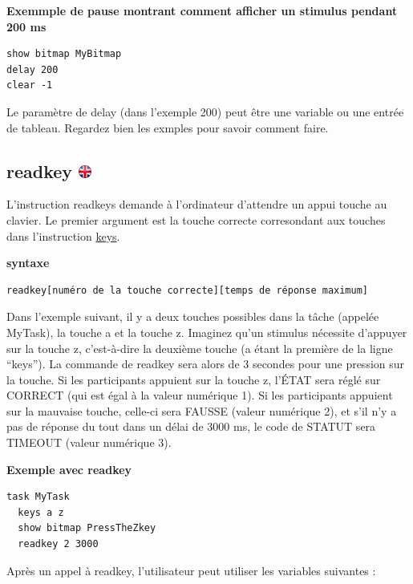 \documentclass[
]{book}
\begin{document}
\textbf{Exemmple de pause montrant comment afficher un stimulus pendant
200 ms}

\begin{verbatim}
show bitmap MyBitmap
delay 200
clear -1
\end{verbatim}

Le paramètre de delay (dans l'exemple 200) peut être une variable ou une
entrée de tableau. Regardez bien les exmples pour savoir comment faire.

\hypertarget{readkey}{%
\subsection[readkey ]{\texorpdfstring{readkey
\href{https://www.psytoolkit.org/doc3.2.0/syntax.html\#task-readkey}{\protect\includegraphics{img/ukflag.png}}}{readkey }}\label{readkey}}

L'instruction readkeys demande à l'ordinateur d'attendre un appui touche
au clavier. Le premier argument est la touche correcte corresondant aux
touches dans l'instruction \protect\hyperlink{keys}{keys}.

\textbf{syntaxe}

\begin{verbatim}
readkey[numéro de la touche correcte][temps de réponse maximum]
\end{verbatim}

Dans l'exemple suivant, il y a deux touches possibles dans la tâche
(appelée MyTask), la touche a et la touche z. Imaginez qu'un stimulus
nécessite d'appuyer sur la touche z, c'est-à-dire la deuxième touche (a
étant la première de la ligne ``keys''). La commande de readkey sera
alors de 3 secondes pour une pression sur la touche. Si les participants
appuient sur la touche z, l'ÉTAT sera réglé sur CORRECT (qui est égal à
la valeur numérique 1). Si les participants appuient sur la mauvaise
touche, celle-ci sera FAUSSE (valeur numérique 2), et s'il n'y a pas de
réponse du tout dans un délai de 3000 ms, le code de STATUT sera TIMEOUT
(valeur numérique 3).

\textbf{Exemple avec readkey}

\begin{verbatim}
task MyTask
  keys a z
  show bitmap PressTheZkey
  readkey 2 3000
\end{verbatim}

Après un appel à readkey, l'utilisateur peut utiliser les variables
suivantes :
\end{document}
